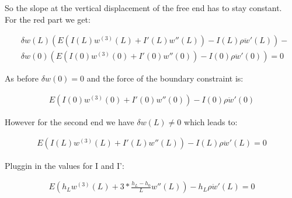 So the slope at the vertical displacement of the free end has to stay constant.\\
\vspace{5mm}
\noindent For the red part we get:

\begin{equation}
    \begin{split}
        &\delta w(L) \left(E\left(I(L)w^{(3)}(L) + I'(L)w''(L)\right) - I(L)\rho \ddot w'(L)\right) - \\
        &\delta w(0) \left(E\left(I(0)w^{(3)}(0) + I'(0)w''(0)\right) - I(0)\rho \ddot w'(0)\right) = 0
    \end{split}
\end{equation}

As before $\delta w(0) = 0$ and the force of the boundary constraint is:

\begin{equation}
    \begin{split}
        E\left(I(0)w^{(3)}(0) + I'(0)w''(0)\right) - I(0)\rho \ddot w'(0)
    \end{split}
\end{equation}

However for the second end we have $\delta w(L) \neq 0$ which leads to:

\begin{equation}
    \begin{split}
        E\left(I(L)w^{(3)}(L) + I'(L)w''(L)\right) - I(L)\rho \ddot w'(L) = 0
    \end{split}
\end{equation}

Pluggin in the values for I and I':

\begin{equation}
    \begin{split}
        E\left(h_Lw^{(3)}(L) + 3*\frac{h_L - h_0}{L}w''(L)\right) - h_L\rho \ddot w'(L) = 0
    \end{split}
\end{equation}






